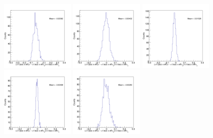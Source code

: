 \begin{figure}[h]
\begin{center}
\includegraphics[width= 0.32\textwidth]{Figures/Chapter5/BPEffONLY_0_90_0.png}
\includegraphics[width= 0.32\textwidth]{Figures/Chapter5/BPEffONLY_0_90_1.png}
\includegraphics[width= 0.32\textwidth]{Figures/Chapter5/BPEffONLY_0_90_2.png}
\includegraphics[width= 0.32\textwidth]{Figures/Chapter5/BPEffONLY_0_90_3.png}
\includegraphics[width= 0.32\textwidth]{Figures/Chapter5/BPEffONLY_0_30_-1.png}

\end{center}
\end{figure}
